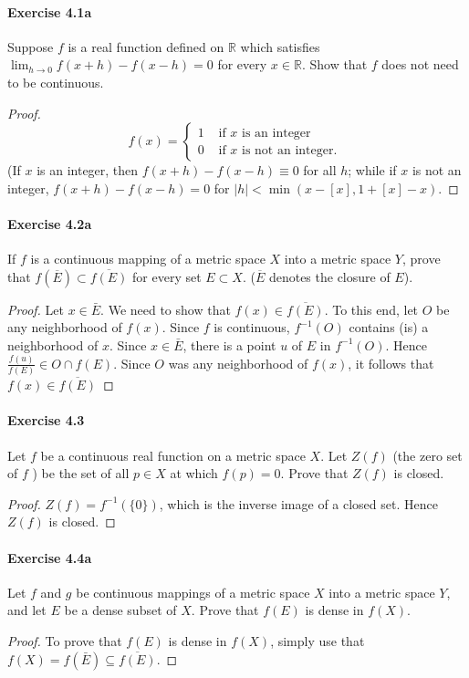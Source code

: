\documentclass{article}
\theoremstyle{definition}
\begin{document}
\paragraph{Exercise 4.1a} Suppose $f$ is a real function defined on $\mathbb{R}$ which satisfies $\lim_{h \rightarrow 0} f(x + h) - f(x - h) = 0$ for every $x \in \mathbb{R}$. Show that $f$ does not need to be continuous.
\begin{proof}
    $$
f(x)= \begin{cases}1 & \text { if } x \text { is an integer } \\ 0 & \text { if } x \text { is not an integer. }\end{cases}
$$
(If $x$ is an integer, then $f(x+h)-f(x-h) \equiv 0$ for all $h$; while if $x$ is not an integer, $f(x+h)-f(x-h)=0$ for $|h|<\min (x-[x], 1+[x]-x)$.
\end{proof}



\paragraph{Exercise 4.2a} If $f$ is a continuous mapping of a metric space $X$ into a metric space $Y$, prove that $f(\overline{E}) \subset \overline{f(E)}$ for every set $E \subset X$. ($\overline{E}$ denotes the closure of $E$).
\begin{proof}
    Let $x \in \bar{E}$. We need to show that $f(x) \in \overline{f(E)}$. To this end, let $O$ be any neighborhood of $f(x)$. Since $f$ is continuous, $f^{-1}(O)$ contains (is) a neighborhood of $x$. Since $x \in \bar{E}$, there is a point $u$ of $E$ in $f^{-1}(O)$. Hence $\frac{f(u)}{f(E)} \in O \cap f(E)$. Since $O$ was any neighborhood of $f(x)$, it follows that $f(x) \in \overline{f(E)}$
\end{proof}



\paragraph{Exercise 4.3} Let $f$ be a continuous real function on a metric space $X$. Let $Z(f)$ (the zero set of $f$ ) be the set of all $p \in X$ at which $f(p)=0$. Prove that $Z(f)$ is closed.
\begin{proof}
    $Z(f)=f^{-1}(\{0\})$, which is the inverse image of a closed set. Hence $Z(f)$ is closed.
\end{proof}



\paragraph{Exercise 4.4a} Let $f$ and $g$ be continuous mappings of a metric space $X$ into a metric space $Y$, and let $E$ be a dense subset of $X$. Prove that $f(E)$ is dense in $f(X)$.
\begin{proof}
    To prove that $f(E)$ is dense in $f(X)$, simply use that $f(X)=f(\bar{E}) \subseteq \overline{f(E)}$.
\end{proof}
\end{document}
